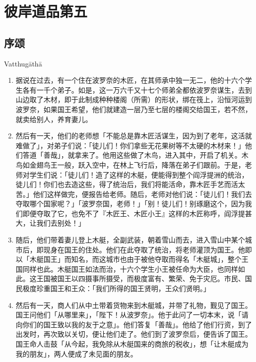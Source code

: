 \chapter{彼岸道品第五}

\section{序颂}

\begin{center}Vatthugāthā\end{center}\vspace{1em}

\begin{enumerate}\item 据说在过去，有一个住在波罗奈的木匠，在其师承中独一无二，他的十六个学生各有一千个弟子。如是，这一万六千又十七个师弟全都依波罗奈谋生，去到山边取了木材，即于此制成种种楼阁（所需）的形状，绑在筏上，沿恒河运到波罗奈，如果国王希望，他们就建造一层乃至七层的楼阁交给国王，若不然，就卖给别人，养育妻儿。
\item 然后有一天，他们的老师想「不能总是靠木匠活谋生，因为到了老年，这活就难做了」，对弟子们说：「徒儿们！你们拿些无花果树等不太硬的木材来！」他们答道「善哉」，就拿来了。他用这些做了木鸟，进入其中，开启了机关。木鸟如金翅鸟王一般，跃入空中，在林上飞行后，降落在弟子们跟前。于是，老师对学生们说：「徒儿们！造了这样的木艇，便能得到整个阎浮提洲的统治，徒儿们！你们也去造这些，得了统治后，我们将能活命，靠木匠手艺而活太苦。」他们这样做完，便报告给老师。随后，老师对他们说：「徒儿们！我们去夺取哪个国家呢？」「波罗奈国，老师！」「别！徒儿们！别琢磨这个，因为我们即便夺取了它，也免不了『木匠王、木匠小王』这样的木匠称呼，阎浮提甚大，让我们去别处！」
\item 随后，他们带着妻儿登上木艇，全副武装，朝着雪山而去，进入雪山中某个城市后，即现身在国王的住处。他们在此夺取了统治，将老师灌顶为国王。他即以「木艇国王」而知名，而这城市也由于被他夺取而得名「木艇城」，整个王国同样也此。木艇国王如法而治，十六个学生小王被任命为大臣，也同样如此。这王国被国王以四摄事所摄受，而极度富有、繁荣、免于灾厄。市民、国民极度珍重国王和王众：「我们所得的国王贤明，王众们贤明。」
\item 然后有一天，商人们从中土带着货物来到木艇城，并带了礼物，觐见了国王。国王问他们「从哪里来」，「陛下！从波罗奈」。他于此问了一切本末，说「请向你们的国王致以我的友于之意」。他们答复「善哉」。他给了他们行资，到了出发时，再次致以关切，便让他们走了。他们到了波罗奈后，便告诉了国王。国王命人击鼓「从今起，我免除从木艇国来的商旅的税收」，想「让木艇成为我的朋友」，两人便成了未见面的朋友。

\end{enumerate}

